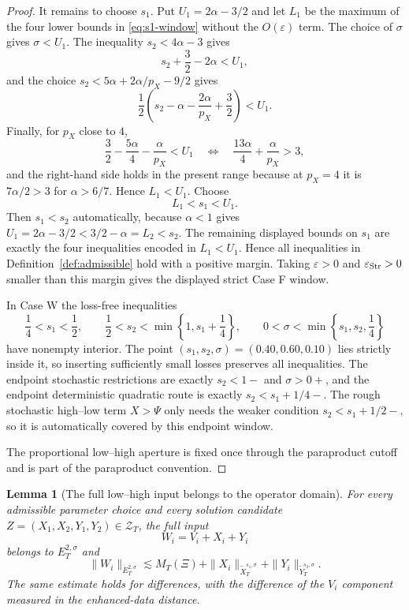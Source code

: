 \documentclass[10pt]{amsart}
\numberwithin{equation}{section}
\theoremstyle{plain}
\newtheorem{lemma}[theorem]{Lemma}
\theoremstyle{definition}
\theoremstyle{remark}
\newcommand{\eps}{\varepsilon}
\begin{document}
\begin{proof}
It remains to choose $s_1$.  Put $U_1=2\alpha-3/2$ and let $L_1$ be the maximum of the four lower bounds in \eqref{eq:s1-window} without the $O(\eps)$ term.  The choice of $\sigma$ gives $\sigma<U_1$.  The inequality $s_2<4\alpha-3$ gives
\[
        s_2+\frac32-2\alpha<U_1,
\]
and the choice $s_2<5\alpha+2\alpha/p_X-9/2$ gives
\[
        \frac12\left(s_2-\alpha-\frac{2\alpha}{p_X}+\frac32\right)<U_1.
\]
Finally, for $p_X$ close to $4$,
\[
        \frac32-\frac{5\alpha}{4}-\frac{\alpha}{p_X}<U_1
        \quad\Longleftrightarrow\quad
        \frac{13\alpha}{4}+\frac{\alpha}{p_X}>3,
\]
and the right-hand side holds in the present range because at $p_X=4$ it is $7\alpha/2>3$ for $\alpha>6/7$.  Hence $L_1<U_1$.  Choose
\begin{equation}\label{eq:parameter-proof-s1-choice}
        L_1<s_1<U_1.
\end{equation}
Then $s_1<s_2$ automatically, because $\alpha<1$ gives $U_1=2\alpha-3/2<3/2-\alpha=L_2<s_2$.  The remaining displayed bounds on $s_1$ are exactly the four inequalities encoded in $L_1<U_1$.  Hence all inequalities in Definition~\ref{def:admissible} hold with a positive margin.  Taking $\eps>0$ and $\eps_{\rm Str}>0$ smaller than this margin gives the displayed strict Case F window.

In Case W the loss-free inequalities
\[
        \frac14<s_1<\frac12,
        \qquad
        \frac12<s_2<\min\left\{1,s_1+\frac14\right\},
        \qquad
        0<\sigma<\min\left\{s_1,s_2,\frac14\right\}
\]
have nonempty interior.  The point $(s_1,s_2,\sigma)=(0.40,0.60,0.10)$ lies strictly inside it, so inserting sufficiently small losses preserves all inequalities.  The endpoint stochastic restrictions are exactly $s_2<1-$ and $\sigma>0+$, and the endpoint deterministic quadratic route is exactly $s_2<s_1+1/4-$.  The rough stochastic high--low term $X>\Psi$ only needs the weaker condition $s_2<s_1+1/2-$, so it is automatically covered by this endpoint window.

The proportional low--high aperture is fixed once through the paraproduct cutoff and is part of the paraproduct convention.
\end{proof}

\begin{lemma}[The full low--high input belongs to the operator domain]\label{lem:full-input-in-E}
For every admissible parameter choice and every solution candidate $Z=(X_1,X_2,Y_1,Y_2)\in\mathcal Z_T$, the full input
\[
        W_i=V_i+X_i+Y_i
\]
belongs to $E_T^{2,\sigma}$ and
\begin{equation}\label{eq:full-input-E-bound}
        \|W_i\|_{E_T^{2,\sigma}}
        \lesssim M_T(\Xi)+\|X_i\|_{\widetilde X_T^{s_1,\sigma}}+
        \|Y_i\|_{\widetilde Y_T^{s_2,\sigma}}.
\end{equation}
The same estimate holds for differences, with the difference of the $V_i$ component measured in the enhanced-data distance.
\end{lemma}
\end{document}
